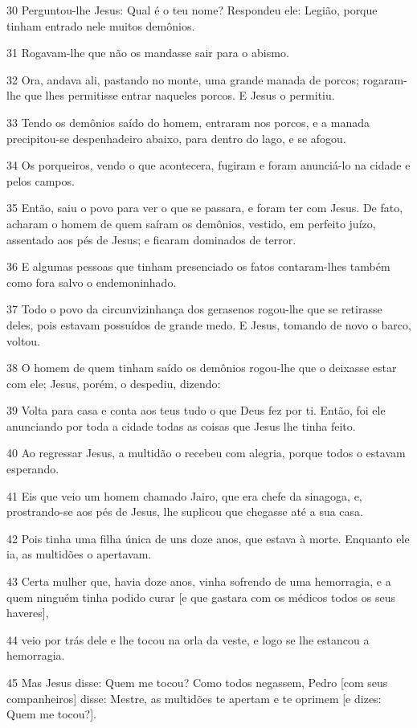 \par 30 Perguntou-lhe Jesus: Qual é o teu nome? Respondeu ele: Legião, porque tinham entrado nele muitos demônios.
\par 31 Rogavam-lhe que não os mandasse sair para o abismo.
\par 32 Ora, andava ali, pastando no monte, uma grande manada de porcos; rogaram-lhe que lhes permitisse entrar naqueles porcos. E Jesus o permitiu.
\par 33 Tendo os demônios saído do homem, entraram nos porcos, e a manada precipitou-se despenhadeiro abaixo, para dentro do lago, e se afogou.
\par 34 Os porqueiros, vendo o que acontecera, fugiram e foram anunciá-lo na cidade e pelos campos.
\par 35 Então, saiu o povo para ver o que se passara, e foram ter com Jesus. De fato, acharam o homem de quem saíram os demônios, vestido, em perfeito juízo, assentado aos pés de Jesus; e ficaram dominados de terror.
\par 36 E algumas pessoas que tinham presenciado os fatos contaram-lhes também como fora salvo o endemoninhado.
\par 37 Todo o povo da circunvizinhança dos gerasenos rogou-lhe que se retirasse deles, pois estavam possuídos de grande medo. E Jesus, tomando de novo o barco, voltou.
\par 38 O homem de quem tinham saído os demônios rogou-lhe que o deixasse estar com ele; Jesus, porém, o despediu, dizendo:
\par 39 Volta para casa e conta aos teus tudo o que Deus fez por ti. Então, foi ele anunciando por toda a cidade todas as coisas que Jesus lhe tinha feito.
\par 40 Ao regressar Jesus, a multidão o recebeu com alegria, porque todos o estavam esperando.
\par 41 Eis que veio um homem chamado Jairo, que era chefe da sinagoga, e, prostrando-se aos pés de Jesus, lhe suplicou que chegasse até a sua casa.
\par 42 Pois tinha uma filha única de uns doze anos, que estava à morte. Enquanto ele ia, as multidões o apertavam.
\par 43 Certa mulher que, havia doze anos, vinha sofrendo de uma hemorragia, e a quem ninguém tinha podido curar [e que gastara com os médicos todos os seus haveres],
\par 44 veio por trás dele e lhe tocou na orla da veste, e logo se lhe estancou a hemorragia.
\par 45 Mas Jesus disse: Quem me tocou? Como todos negassem, Pedro [com seus companheiros] disse: Mestre, as multidões te apertam e te oprimem [e dizes: Quem me tocou?].
